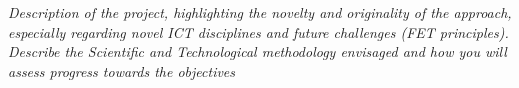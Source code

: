 %


\emph{Description of the project, highlighting the novelty
  and originality of the approach, especially regarding novel ICT disciplines
  and future challenges (FET principles). Describe the Scientific and
  Technological methodology envisaged and how you will assess progress towards
  the objectives} 


% 
